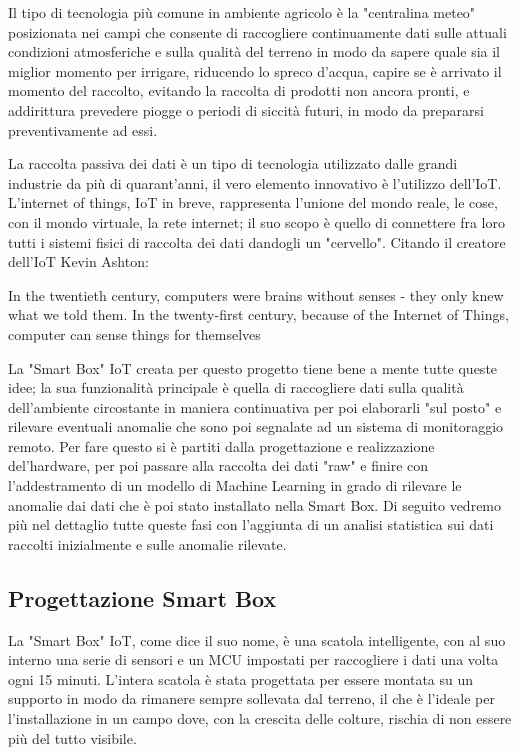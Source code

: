 \documentclass[a4paper, 12pt]{report}
\begin{document}
Il tipo di tecnologia più comune in ambiente agricolo è la "centralina meteo" posizionata nei campi che consente di raccogliere continuamente dati sulle attuali condizioni atmosferiche e sulla qualità del terreno in modo
da sapere quale sia il miglior momento per irrigare, riducendo lo spreco d'acqua, capire se è arrivato il momento del raccolto, evitando la raccolta di prodotti non ancora pronti, e addirittura prevedere piogge o 
periodi di siccità futuri, in modo da prepararsi preventivamente ad essi.

La raccolta passiva dei dati è un tipo di tecnologia utilizzato dalle grandi industrie da più di quarant'anni, il vero elemento innovativo è l'utilizzo dell'IoT. L'internet of things\cite{iot}, IoT in breve, rappresenta l'unione del
mondo reale, le cose, con il mondo virtuale, la rete internet; il suo scopo è quello di connettere fra loro tutti i sistemi fisici di raccolta dei dati dandogli un "cervello". Citando il creatore dell'IoT Kevin Ashton: 

\begin{displayquote}
  In the twentieth century, computers were brains without senses - they only knew what we told them. In the twenty-first century, because of the Internet of Things, computer can sense things for themselves
\end{displayquote}

La "Smart Box" IoT creata per questo progetto tiene bene a mente tutte queste idee; la sua funzionalità principale è quella di raccogliere dati sulla qualità dell'ambiente circostante in maniera continuativa per poi 
elaborarli "sul posto" e rilevare eventuali anomalie che sono poi segnalate ad un sistema di monitoraggio remoto. Per fare questo si è partiti dalla progettazione e realizzazione del'hardware, per poi passare alla raccolta
dei dati "raw" e finire con l'addestramento di un modello di Machine Learning in grado di rilevare le anomalie dai dati che è poi stato installato nella Smart Box.
Di seguito vedremo più nel dettaglio tutte queste fasi con l'aggiunta di un analisi statistica sui dati raccolti inizialmente e sulle anomalie rilevate.

\subsection*{Progettazione Smart Box}
\vspace{0.5cm}

La "Smart Box" IoT, come dice il suo nome, è una scatola intelligente, con al suo interno una serie di sensori e un MCU impostati per raccogliere i dati una volta ogni 15 minuti. L'intera scatola è stata progettata 
per essere montata su un supporto in modo da rimanere sempre sollevata dal terreno, il che è l'ideale per l'installazione in un campo dove, con la crescita delle colture, rischia di non essere più del tutto visibile.
\end{document}
